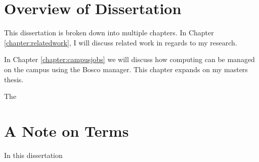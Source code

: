 \section{Overview of Dissertation}

This dissertation is broken down into multiple chapters.  In Chapter \ref{chapter:relatedwork}, I will discuss related work in regards to my research.  

In Chapter \ref{chapter:campusjobs} we will discuss how computing can be managed on the campus using the Bosco manager.  This chapter expands on my masters thesis.

The



\section{A Note on Terms}

In this dissertation 

